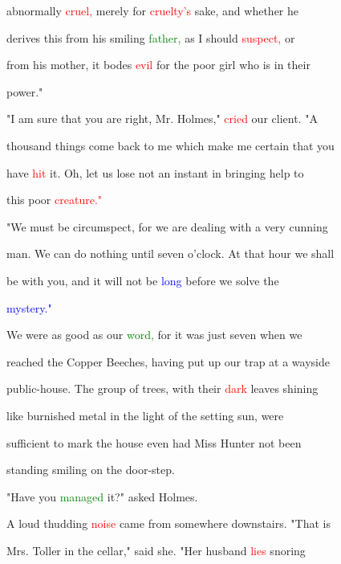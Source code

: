  abnormally \textcolor{red}{cruel,} merely for \textcolor{red}{cruelty's} sake, and whether he

 derives this from his \textcolor{BurntOrange}{smiling} \textcolor{green}{father,} as I should \textcolor{red}{suspect,} or

 from his \textcolor{BurntOrange}{mother,} it bodes \textcolor{red}{evil} for the poor girl who is in their

 power."



 "I am sure that you are right, Mr. Holmes," \textcolor{red}{cried} our client. "A

 thousand things come back to me which make me certain that you

 have \textcolor{red}{hit} it. Oh, let us \textcolor{BurntOrange}{lose} not an instant in bringing help to

 this poor \textcolor{red}{creature."}



 "We must be circumspect, for we are \textcolor{BurntOrange}{dealing} with a very \textcolor{BurntOrange}{cunning}

 man. We can do nothing until seven o'clock. At that hour we shall

 be with you, and it will not be \textcolor{blue}{long} before we solve the

 \textcolor{blue}{mystery."}



 We were as \textcolor{BurntOrange}{good} as our \textcolor{green}{word,} for it was just seven when we

 reached the Copper Beeches, having put up our trap at a wayside

 public-house. The group of \textcolor{BurntOrange}{trees,} with their \textcolor{red}{dark} leaves shining

 like burnished metal in the light of the setting \textcolor{BurntOrange}{sun,} were

 sufficient to mark the house even had Miss \textcolor{BurntOrange}{Hunter} not been

 standing \textcolor{BurntOrange}{smiling} on the door-step.



 "Have you \textcolor{green}{managed} it?" asked Holmes.



 A loud thudding \textcolor{red}{noise} came from somewhere downstairs. "That is

 Mrs. Toller in the cellar," said she. "Her husband \textcolor{red}{lies} snoring

